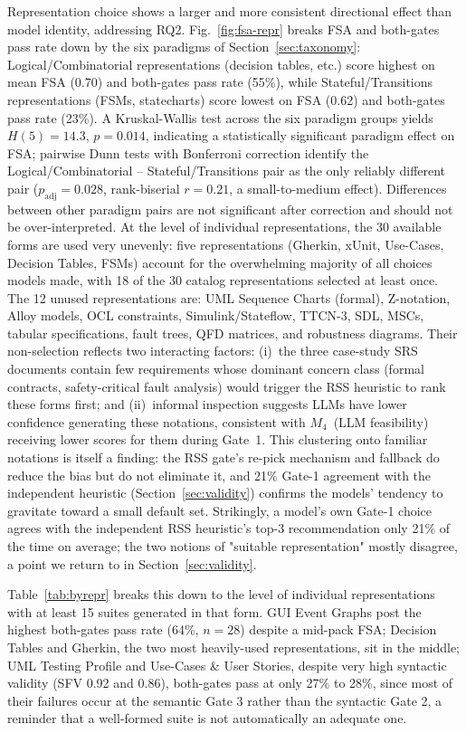 \documentclass[conference]{IEEEtran}
\newcommand{\etc}{etc.}
\begin{document}
  Representation choice shows a larger and more consistent directional effect
  than model identity, addressing RQ2. Fig.~\ref{fig:fsa-repr} breaks FSA and
  both-gates pass rate down by the six paradigms of
  Section~\ref{sec:taxonomy}: Logical/Combinatorial representations (decision
  tables, \etc) score highest on mean FSA (0.70) and both-gates pass rate
  (55\%), while Stateful/Transitions representations (FSMs, statecharts) score
  lowest on FSA (0.62) and both-gates pass rate (23\%). A Kruskal-Wallis test
  across the six paradigm groups yields $H(5)=14.3$, $p=0.014$, indicating a
  statistically significant paradigm effect on FSA; pairwise Dunn tests with
  Bonferroni correction identify the Logical/Combinatorial -- Stateful/Transitions
  pair as the only reliably different pair ($p_{\text{adj}}=0.028$,
  rank-biserial $r=0.21$, a small-to-medium effect). Differences between
  other paradigm pairs are not significant after correction and should not be
  over-interpreted. At the level of individual representations, the 30 available forms are used
  very unevenly: five representations (Gherkin, xUnit, Use-Cases, Decision
  Tables, FSMs) account for the overwhelming majority of all choices models
  made, with 18 of the 30 catalog representations selected at least once.
  The 12 unused representations are: UML Sequence Charts (formal), Z-notation,
  Alloy models, OCL constraints, Simulink/Stateflow, TTCN-3, SDL, MSCs,
  tabular specifications, fault trees, QFD matrices, and robustness diagrams.
  Their non-selection reflects two interacting factors: (i)~the three
  case-study SRS documents contain few requirements whose dominant concern
  class (formal contracts, safety-critical fault analysis) would trigger the
  RSS heuristic to rank these forms first; and (ii)~informal inspection suggests
  LLMs have lower confidence generating these notations, consistent with
  $M_4$~(LLM feasibility) receiving lower scores for them during Gate~1. This
  clustering onto familiar notations is itself a finding: the RSS gate's
  re-pick mechanism and fallback do reduce the bias but do not eliminate it,
  and 21\% Gate-1 agreement with the independent heuristic (Section~\ref{sec:validity})
  confirms the models' tendency to gravitate toward a small default set. 
  Strikingly, a model's own Gate-1 choice agrees
  with the independent RSS heuristic's top-3 recommendation only 21\% of the
  time on average; the two notions of "suitable representation" mostly
  disagree, a point we return to in Section~\ref{sec:validity}.

  Table~\ref{tab:byrepr} breaks this down to the level of individual
  representations with at least 15 suites generated in that form. GUI Event
  Graphs post the highest both-gates pass rate (64\%, $n=28$) despite a mid-pack
  FSA; Decision Tables and Gherkin, the two most heavily-used representations,
  sit in the middle; UML Testing Profile and Use-Cases \& User Stories, despite
  very high syntactic validity (SFV 0.92 and 0.86), both-gates pass at only
  27\% to 28\%, since most of their failures occur at the semantic Gate 3 rather
  than the syntactic Gate 2, a reminder that a well-formed suite is not
  automatically an adequate one.
\end{document}
